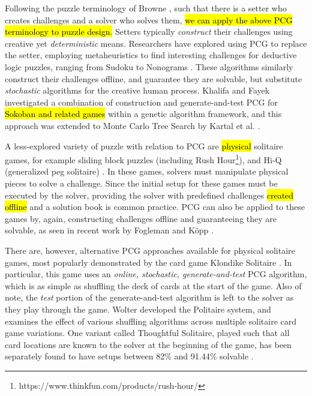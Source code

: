 \documentclass[journal]{IEEEtran}
\begin{document}
Following the puzzle terminology of Browne \cite{PUZZLENATURE}, such that there is a setter who creates challenges and a solver who solves them, \hl{we can apply the above PCG terminology to puzzle design.} Setters typically {\it construct} their challenges using creative yet {\it deterministic} means. 
Researchers have explored using PCG to replace the setter, employing metaheuristics to find interesting challenges for deductive logic puzzles, ranging from Sudoku \cite{SUDOKU} to Nonograms \cite{NONOGRAM}. These algorithms similarly construct their challenges offline, and guarantee they are solvable, but substitute {\it stochastic} algorithms for the creative human process. Khalifa and Fayek\cite{PUZZLELANG} investigated a combination of construction and generate-and-test PCG for \hl{Sokoban and related games} within a genetic algorithm framework, and this approach was extended to Monte Carlo Tree Search by Kartal et al. \cite{SOKOBAN}.

A less-explored variety of puzzle with relation to PCG 
are \hl{physical} solitaire games, for example
sliding block puzzles \cite{FIFTEEN} (including Rush Hour\footnote{https://www.thinkfun.com/products/rush-hour/}), 
and Hi-Q (generalized peg solitaire) \cite{PEG}. In these games, solvers must manipulate physical pieces to solve a challenge. Since the initial setup for these games must be executed by the solver, providing the solver with predefined challenges \hl{created offline} and a solution book is common practice. PCG can also be applied to these games by, again, constructing challenges offline and guaranteeing they are solvable, as seen in recent work by Fogleman \cite{RUSHHOUR} and K{\"o}pp \cite{TANGRAM}. 

There are, however, alternative PCG approaches available for physical solitaire games, most popularly demonstrated by the card game Klondike Solitaire \cite{morehead2014complete}. In particular, this game uses an {\it online, stochastic, generate-and-test} PCG algorithm, which is as simple as shuffling the deck of cards at the start of the game. Also of note, the {\it test} portion of the generate-and-test algorithm is left to the solver as they play through the game. Wolter \cite{SOLITAIREVARIANTS} developed the Politaire system, and examines the effect of various shuffling algorithms across multiple solitaire card game variations. One variant called Thoughtful Solitaire, played such that all card locations are known to the solver at the beginning of the game, has been separately found to have setups between 82\% and 91.44\% solvable \cite{THOUGHTFUL}. 
\end{document}
